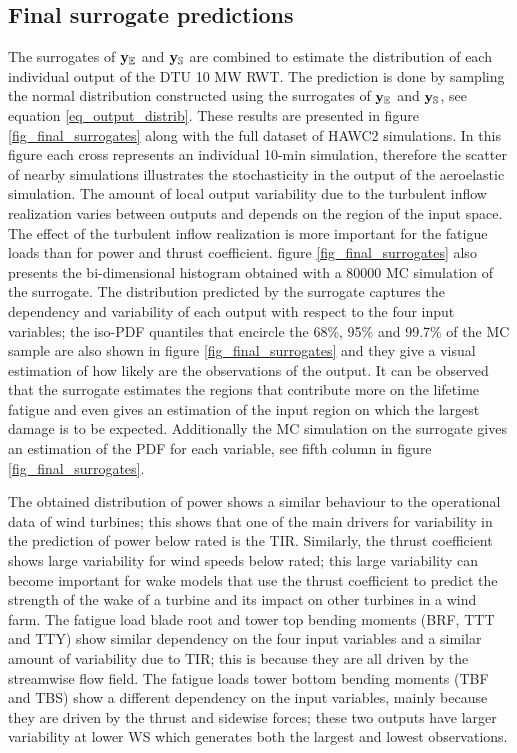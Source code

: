 \documentclass[preprint,12pt]{elsarticle}
\begin{document}
\subsection{Final surrogate predictions}


The surrogates of $\mathbf{y}_{\mathbb{E}}$ and $\mathbf{y}_{\mathbb{S}}$ are combined to estimate the distribution of each individual output of the DTU 10 MW RWT. The prediction is done by sampling the normal distribution constructed using the surrogates of $\mathbf{y}_{\mathbb{E}}$ and $\mathbf{y}_{\mathbb{S}}$, see equation \ref{eq_output_distrib}. These results are presented in figure \ref{fig_final_surrogates} along with the full dataset of HAWC2 simulations. In this figure each cross represents an individual 10-min simulation, therefore the scatter of nearby simulations illustrates the stochasticity in the output of the aeroelastic simulation. The amount of local output variability due to the turbulent inflow realization varies between outputs and depends on the region of the input space. The effect of the turbulent inflow realization is more important for the fatigue loads than for power and thrust coefficient. figure \ref{fig_final_surrogates} also presents the bi-dimensional histogram obtained with a 80000 MC simulation of the surrogate. The distribution predicted by the surrogate captures the dependency and variability of each output with respect to the four input variables; the iso-PDF quantiles that encircle the 68\%, 95\% and 99.7\% of the MC sample are also shown in figure \ref{fig_final_surrogates} and they give a visual estimation of how likely are the observations of the output. It can be observed that the surrogate estimates the regions that contribute more on the lifetime fatigue and even gives an estimation of the input region on which the largest damage is to be expected. Additionally the MC simulation on the surrogate gives an estimation of the PDF for each variable, see fifth column in figure \ref{fig_final_surrogates}. 

The obtained distribution of power shows a similar behaviour to the operational data of wind turbines; this shows that one of the main drivers for variability in the prediction of power below rated is the TIR. Similarly, the thrust coefficient shows large variability for wind speeds below rated; this large variability can become important for wake models that use the thrust coefficient to predict the strength of the wake of a turbine and its impact on other turbines in a wind farm. The fatigue load blade root and tower top bending moments (BRF, TTT and TTY) show similar dependency on the four input variables and a similar amount of variability due to TIR; this is because they are all driven by the streamwise flow field. The fatigue loads tower bottom bending moments (TBF and TBS) show a different dependency on the input variables, mainly because they are driven by the thrust and sidewise forces; these two outputs have larger variability at lower WS which generates both the largest and lowest observations.  
\end{document}
